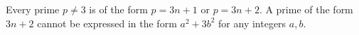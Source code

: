Every prime $p \neq 3$ is of the form $p = 3n + 1$ or $p = 3n + 2$. A prime of the form $3n + 2$ cannot be expressed in the form $a^2 + 3b^2$ for any integers $a, b$.
